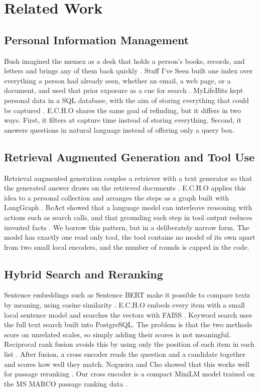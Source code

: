\documentclass[conference]{IEEEtran}
\begin{document}
\section{Related Work}\label{sec:related}
\subsection{Personal Information Management}
Bush imagined the memex as a desk that holds a person's books, records, and letters and brings any of them back quickly \cite{b1}. Stuff I've Seen built one index over everything a person had already seen, whether an email, a web page, or a document, and used that prior exposure as a cue for search \cite{b2}. MyLifeBits kept personal data in a SQL database, with the aim of storing everything that could be captured \cite{b3}. E.C.H.O shares the same goal of refinding, but it differs in two ways. First, it filters at capture time instead of storing everything. Second, it answers questions in natural language instead of offering only a query box.

\subsection{Retrieval Augmented Generation and Tool Use}
Retrieval augmented generation couples a retriever with a text generator so that the generated answer draws on the retrieved documents \cite{b4}. E.C.H.O applies this idea to a personal collection and arranges the steps as a graph built with LangGraph \cite{b5}. ReAct showed that a language model can interleave reasoning with actions such as search calls, and that grounding each step in tool output reduces invented facts \cite{b13}. We borrow this pattern, but in a deliberately narrow form. The model has exactly one read only tool, the tool contains no model of its own apart from two small local encoders, and the number of rounds is capped in the code.

\subsection{Hybrid Search and Reranking}
Sentence embeddings such as Sentence BERT make it possible to compare texts by meaning, using cosine similarity \cite{b6}. E.C.H.O embeds every item with a small local sentence model and searches the vectors with FAISS \cite{b8}. Keyword search uses the full text search built into PostgreSQL. The problem is that the two methods score on unrelated scales, so simply adding their scores is not meaningful. Reciprocal rank fusion avoids this by using only the position of each item in each list \cite{b9}. After fusion, a cross encoder reads the question and a candidate together and scores how well they match. Nogueira and Cho showed that this works well for passage reranking \cite{b10}. Our cross encoder is a compact MiniLM \cite{b7} model trained on the MS MARCO passage ranking data \cite{b11}.
\end{document}
